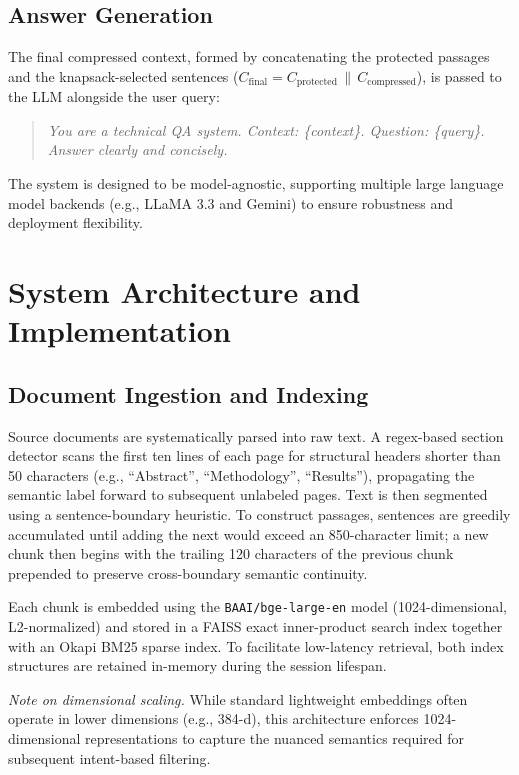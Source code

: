 \documentclass[conference]{IEEEtran}
\begin{document}
\subsection{Answer Generation}
The final compressed context, formed by concatenating the protected passages and the knapsack-selected sentences
($C_{\mathrm{final}} = C_{\mathrm{protected}} \,\|\, C_{\mathrm{compressed}}$),
is passed to the LLM alongside the user query:
\begin{quote}
\small\textit{You are a technical QA system.
Context: \{context\}.
Question: \{query\}.
Answer clearly and concisely.}
\end{quote}
The system is designed to be model-agnostic, supporting multiple large language model backends (e.g., LLaMA 3.3 and Gemini) to ensure robustness and deployment flexibility.


\section{System Architecture and Implementation}

\subsection{Document Ingestion and Indexing}
Source documents are systematically parsed into raw text. A regex-based section detector scans the
first ten lines of each page for structural headers shorter than
50 characters (e.g., ``Abstract'', ``Methodology'',
``Results''), propagating the semantic label forward to subsequent unlabeled
pages. Text is then segmented using a sentence-boundary
heuristic. To construct passages, sentences are greedily accumulated
until adding the next would exceed an 850-character limit; a new
chunk then begins with the trailing 120 characters of the
previous chunk prepended to preserve cross-boundary
semantic continuity.

Each chunk is embedded using the \texttt{BAAI/bge-large-en} model
(1024-dimensional, L2-normalized)
and stored in a FAISS exact
inner-product search index together with an Okapi BM25
sparse index. To facilitate low-latency retrieval, both index structures are retained in-memory during the session lifespan.

\smallskip
\textit{Note on dimensional scaling.} While
standard lightweight embeddings often operate in lower dimensions (e.g., 384-d), this architecture enforces 1024-dimensional representations to capture the nuanced semantics required for subsequent intent-based filtering.
\end{document}
